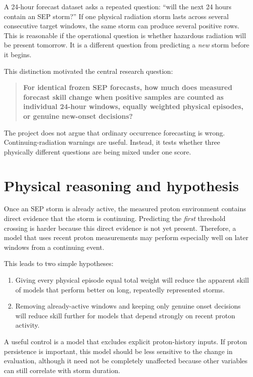 \documentclass[11pt]{article}
\begin{document}
A 24-hour forecast dataset asks a repeated question: ``will the next 24 hours contain an SEP storm?'' If one physical radiation storm lasts across several consecutive target windows, the same storm can produce several positive rows. This is reasonable if the operational question is whether hazardous radiation will be present tomorrow. It is a different question from predicting a \emph{new} storm before it begins.

This distinction motivated the central research question:

\begin{quote}
\textbf{For identical frozen SEP forecasts, how much does measured forecast skill change when positive samples are counted as individual 24-hour windows, equally weighted physical episodes, or genuine new-onset decisions?}
\end{quote}

The project does not argue that ordinary occurrence forecasting is wrong. Continuing-radiation warnings are useful. Instead, it tests whether three physically different questions are being mixed under one score.

\section{Physical reasoning and hypothesis}

Once an SEP storm is already active, the measured proton environment contains direct evidence that the storm is continuing. Predicting the \emph{first} threshold crossing is harder because this direct evidence is not yet present. Therefore, a model that uses recent proton measurements may perform especially well on later windows from a continuing event.

This leads to two simple hypotheses:

\begin{enumerate}
    \item Giving every physical episode equal total weight will reduce the apparent skill of models that perform better on long, repeatedly represented storms.
    \item Removing already-active windows and keeping only genuine onset decisions will reduce skill further for models that depend strongly on recent proton activity.
\end{enumerate}

A useful control is a model that excludes explicit proton-history inputs. If proton persistence is important, this model should be less sensitive to the change in evaluation, although it need not be completely unaffected because other variables can still correlate with storm duration.
\end{document}
